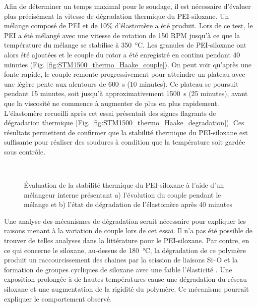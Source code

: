 Afin de déterminer un temps maximal pour le soudage, il est nécessaire d'évaluer plus précisément la vitesse de dégradation thermique du PEI-siloxane. 
Un mélange composé de PEI et de 10\% d'élastomère a été produit. 
Lors de ce test, le PEI a été mélangé avec une vitesse de rotation de 150 RPM jusqu'à ce que la température du mélange se stabilise à \SI[locale=FR]{350}{\celsius}. 
Les granules de PEI-siloxane ont alors été ajoutées et le couple du rotor a été enregistré en continu pendant 40 minutes (Fig. \ref{fig:STM1500_thermo_Haake_couple}). 
On peut voir qu'après une fonte rapide, le couple remonte progressivement pour atteindre un plateau avec une légère pente aux alentours de \SI[locale=FR]{600}{\second} (10 minutes). 
Ce plateau se poursuit pendant 15 minutes, soit jusqu'à approximativement \SI[locale=FR]{1500}{\second} (25 minutes), avant que la viscosité ne commence à augmenter de plus en plus rapidement. 
L'élastomère recueilli après cet essai présentait des signes flagrants de dégradation thermique (Fig. \ref{fig:STM1500_thermo_Haake_degradation}). 
Ces résultats permettent de confirmer que la stabilité thermique du PEI-siloxane est suffisante pour réaliser des soudures à condition que la température soit gardée sous contrôle. 

\begin{figure}[h]	
	\centering
	 \qquad
	 \\
	\caption{Évaluation de la stabilité thermique du PEI-siloxane à l'aide d'un mélangeur interne présentant a) l'évolution du couple pendant le mélange et b) l'état de dégradation de l'élastomère après 40 minutes}
	\label{fig:STM1500_thermo_Haake}
\end{figure}

Une analyse des mécanismes de dégradation serait nécessaire pour expliquer les raisons menant à la variation de couple lors de cet essai. 
Il n'a pas été possible de trouver de telles analyses dans la littérature pour le PEI-siloxane. 
Par contre, en ce qui concerne le siloxane, au-dessus de \SI{180}{\celsius}, la dégradation de ce polymère produit un raccourcissement des chaines par la scission de liaisons Si--O  et la formation de groupes cycliques de siloxane avec une faible l'élasticité \cite{Heinemann2004}. 
Une exposition prolongée à de hautes températures cause une dégradation du réseau siloxane et une augmentation de la rigidité du polymère. 
Ce mécanisme pourrait expliquer le comportement observé.  

